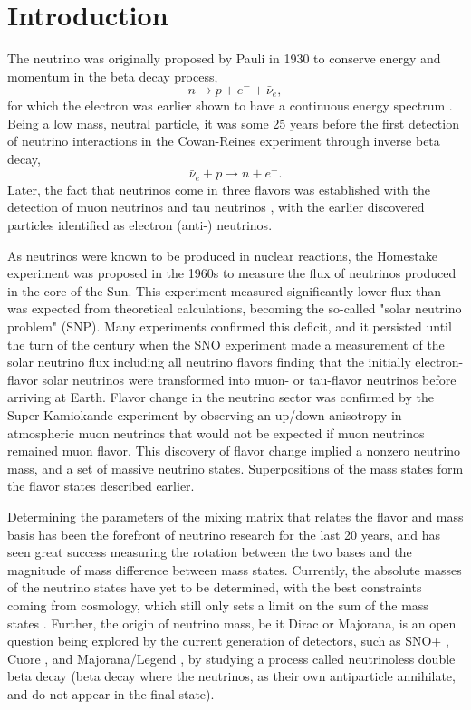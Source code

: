 \chapter{Introduction}
The neutrino was originally proposed by Pauli in 1930 \cite{pauli} to conserve energy and momentum in the beta decay process,
\begin{equation}
n \rightarrow p + e^- + \bar{\nu}_e,
\end{equation}
for which the electron was earlier shown to have a continuous energy spectrum \cite{chadwick}.
Being a low mass, neutral particle, it was some 25 years before the first detection of neutrino interactions in the Cowan-Reines experiment \cite{cowan-reines} through inverse beta decay,
\begin{equation}
\bar{\nu}_e + p \rightarrow n + e^+.
\end{equation}
Later, the fact that neutrinos come in three flavors was established with the detection of muon neutrinos \cite{danby} and tau neutrinos \cite{donut}, with the earlier discovered particles identified as electron (anti-) neutrinos.

As neutrinos were known to be produced in nuclear reactions, the Homestake experiment \cite{homestake} was proposed in the 1960s to measure the flux of neutrinos produced in the core of the Sun.
This experiment measured significantly lower flux than was expected from theoretical calculations, becoming the so-called "solar neutrino problem" (SNP).
Many experiments \cite{solarstuff} confirmed this deficit, and it persisted until the turn of the century when the SNO experiment \cite{3phase} made a measurement of the solar neutrino flux including all neutrino flavors finding that the initially electron-flavor solar neutrinos were transformed into muon- or tau-flavor neutrinos before arriving at Earth.
Flavor change in the neutrino sector was confirmed by the Super-Kamiokande \cite{superk} experiment by observing an up/down anisotropy in atmospheric muon neutrinos that would not be expected if muon neutrinos remained muon flavor.
This discovery of flavor change implied a nonzero neutrino mass, and a set of massive neutrino states.
Superpositions of the mass states form the flavor states described earlier.

Determining the parameters of the mixing matrix that relates the flavor and mass basis has been the forefront of neutrino research for the last 20 years, and has seen great success measuring the rotation between the two bases and the magnitude of mass difference between mass states. 
Currently, the absolute masses of the neutrino states have yet to be determined, with the best constraints coming from cosmology, which still only sets a limit on the sum of the mass states \cite{cosmo_neutrinos}.
Further, the origin of neutrino mass, be it Dirac or Majorana, is an open question being explored by the current generation of detectors, such as SNO+ \cite{snop}, Cuore \cite{cuore}, and Majorana/Legend \cite{majoranalegend}, by studying a process called neutrinoless double beta decay (beta decay where the neutrinos, as their own antiparticle annihilate, and do not appear in the final state).


